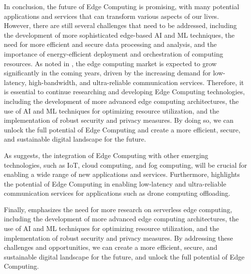 \documentclass[11pt,a4paper]{article}
\begin{document}
In conclusion, the future of Edge Computing is promising, with many potential applications and services that can transform various aspects of our lives. However, there are still several challenges that need to be addressed, including the development of more sophisticated edge-based AI and ML techniques, the need for more efficient and secure data processing and analysis, and the importance of energy-efficient deployment and orchestration of computing resources. As noted in \cite{arxiv:1911.02794}, the edge computing market is expected to grow significantly in the coming years, driven by the increasing demand for low-latency, high-bandwidth, and ultra-reliable communication services. Therefore, it is essential to continue researching and developing Edge Computing technologies, including the development of more advanced edge computing architectures, the use of AI and ML techniques for optimizing resource utilization, and the implementation of robust security and privacy measures. By doing so, we can unlock the full potential of Edge Computing and create a more efficient, secure, and sustainable digital landscape for the future. 

As \cite{arxiv:2309.03420} suggests, the integration of Edge Computing with other emerging technologies, such as IoT, cloud computing, and fog computing, will be crucial for enabling a wide range of new applications and services. Furthermore, \cite{arxiv:2403.19729} highlights the potential of Edge Computing in enabling low-latency and ultra-reliable communication services for applications such as drone computing offloading. 

Finally, \cite{arxiv:2502.15775} emphasizes the need for more research on serverless edge computing, including the development of more advanced edge computing architectures, the use of AI and ML techniques for optimizing resource utilization, and the implementation of robust security and privacy measures. By addressing these challenges and opportunities, we can create a more efficient, secure, and sustainable digital landscape for the future, and unlock the full potential of Edge Computing.
\end{document}

